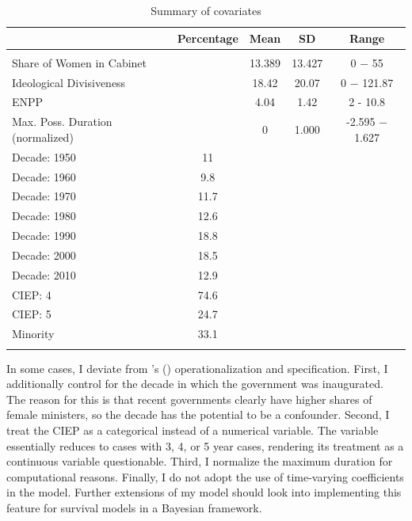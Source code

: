 \documentclass[11pt]{article}
\newcommand\possecite[1]{\citeauthor{#1}'s (\citeyear{#1})}
\begin{document}
\begin{table}[!htbp] \centering 
  \caption{Summary of covariates} 
  \label{tab:summarystat} 
\begin{tabular}{@{\extracolsep{5pt}}lcccc} 
& \multicolumn{1}{c}{\textbf{Percentage}} & \multicolumn{1}{c}{\textbf{Mean}} & \multicolumn{1}{c}{\textbf{SD}} & \multicolumn{1}{c}{\textbf{Range}}
\\\hline 
\hline \\[-1.8ex]  
Share of Women in Cabinet & & 13.389 & 13.427 & 0 $-$ 55\\ 
Ideological Divisiveness & & 18.42 & 20.07 & 0 $-$ 121.87  \\ 
ENPP & & 4.04 & 1.42 & 2 - 10.8\\ 
Max. Poss. Duration (normalized) & & 0 & 1.000 & -2.595 $-$ 1.627 \\\hline 
Decade: 1950 & 11  & & & \\ 
Decade: 1960 & 9.8 & & &   \\ 
Decade: 1970 & 11.7 & & &   \\ 
Decade: 1980 & 12.6 & & &   \\ 
Decade: 1990 & 18.8 & & &   \\ 
Decade: 2000 & 18.5 & & &   \\ 
Decade: 2010 & 12.9 & & &   \\ 
CIEP: 4      & 74.6 & & & \\ 
CIEP: 5      & 24.7 & & &  \\ 
Minority     & 33.1 & & & \\ 
\hline \\[-1.8ex] 
\end{tabular} 
\end{table} 

In some cases, I deviate from \possecite{KK20} operationalization and specification. First, I additionally control for the decade in which the government was inaugurated. The reason for this is that recent governments clearly have higher shares of female ministers, so the decade has the potential to be a confounder. Second, I treat the CIEP as a categorical instead of a numerical variable. The variable essentially reduces to cases with 3, 4, or 5 year cases, rendering its treatment as a continuous variable questionable. Third, I normalize the maximum duration for computational reasons. Finally, I do not adopt the use of time-varying coefficients in the model. Further extensions of my model should look into implementing this feature for survival models in a Bayesian framework. 
\end{document}
